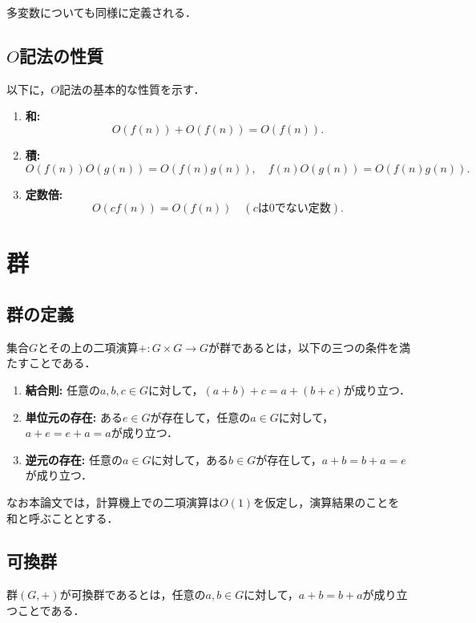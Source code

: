 \documentclass[11pt]{jsreport}
\theoremstyle{plain} %
\theoremstyle{definition}
\begin{document}
多変数についても同様に定義される．

\subsection{$O$記法の性質}

以下に，$O$記法の基本的な性質を示す．

\begin{enumerate}
    \item \textbf{和:} \[
            O(f(n)) + O(f(n)) = O(f(n)).
        \]
    \item \textbf{積:}
        \[
            O(f(n))O(g(n)) = O(f(n)g(n)), \quad f(n)O(g(n)) = O(f(n)g(n)).
        \]
    \item \textbf{定数倍:}
        \[
            O(cf(n)) = O(f(n)) \quad (cは0でない定数).
        \]
\end{enumerate}

\section{群}

\subsection{群の定義}

集合$G$とその上の二項演算$+: G \times G \to G$が群であるとは，以下の三つの条件を満たすことである．

\begin{enumerate}
    \item \textbf{結合則:} 任意の$a, b, c \in G$に対して，$(a + b) + c = a + (b + c)$が成り立つ．
    \item \textbf{単位元の存在:} ある$e \in G$が存在して，任意の$a \in G$に対して，$a + e = e + a = a$が成り立つ．
    \item \textbf{逆元の存在:} 任意の$a \in G$に対して，ある$b \in G$が存在して，$a + b = b + a = e$が成り立つ．
\end{enumerate}

なお本論文では，計算機上での二項演算は$O(1)$を仮定し，演算結果のことを和と呼ぶこととする．

\subsection{可換群}

群$(G, +)$が可換群であるとは，任意の$a, b \in G$に対して，$a + b = b + a$が成り立つことである．
\end{document}
